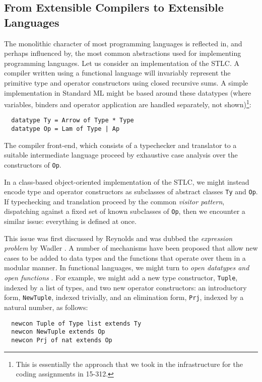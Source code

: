 \subsection{From Extensible Compilers to Extensible Languages}\label{evolution}
The monolithic character of most programming languages is reflected in, and perhaps influenced by, the most common abstractions used for implementing programming languages.
Let us consider an implementation of the STLC. 
A compiler written using a functional language will invariably represent the primitive type  and operator constructors using {closed} recursive sums. 
A simple implementation in Standard ML might be based around these datatypes (where variables, binders and operator application are handled separately, not shown)\footnote{This is essentially the approach that we took in the infrastructure for the coding assignments in 15-312.}:
\begin{lstlisting}
  datatype Ty = Arrow of Type * Type
  datatype Op = Lam of Type | Ap 
\end{lstlisting}

The compiler front-end, which consists of a typechecker and translator to a suitable intermediate language   proceed by exhaustive case analysis over the constructors of \verb|Op|.

In a class-based object-oriented implementation of the STLC, we might instead encode type and operator constructors as subclasses of abstract classes \verb|Ty| and \verb|Op|. If typechecking and translation proceed by the common \emph{visitor pattern}, dispatching against a fixed set of {known} subclasses of \verb|Op|, then we encounter a similar issue: everything is defined at once. 

This issue was first discussed by Reynolds \cite{Reynolds75} and was dubbed the \emph{expression problem} by Wadler \cite{wadler1998expression}. A number of mechanisms have been proposed that allow new cases to be added to data types and the functions that operate over them in a modular manner. 
In functional languages, we might turn to \emph{open datatypes and open functions} \cite{conf/ppdp/LohH06, Millstein:2002:MTH:581478.581489}. For example, we might add a new type constructor, \verb|Tuple|, indexed by a list of types, and two new operator constructors: an introductory form, \verb|NewTuple|, indexed trivially, and an elimination form, \verb|Prj|, indexed by a natural number, as follows:
\begin{lstlisting}
  newcon Tuple of Type list extends Ty
  newcon NewTuple extends Op
  newcon Prj of nat extends Op
\end{lstlisting}

